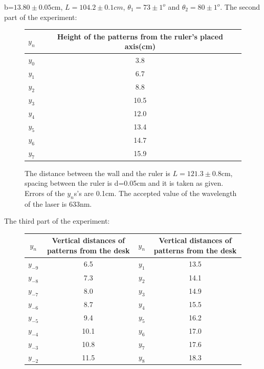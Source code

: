 \documentclass[11pt,a4paper]{article}
\begin{document}
{\begin{figure}[H]
\begin{center}
	\end{center}
\end{figure}
\par b=$13.80\pm0.05$cm, $L=104.2\pm0.1cm$, $\theta_1=73\pm1^o$ and $\theta_2=80\pm1^o$.
The second part of the experiment:
\begin{center}
	\begin{figure} [H] 
		\begin{tabular}{|c |c|} \hline
			$y_n$& Height of the patterns from the ruler's placed axis(cm) \\ [0.5ex] 
			\hline
			$y_0$&3.8 \\
			\hline
			$y_1$ & 6.7\\
			\hline 
			$y_2$ &8.8\\
			\hline 
			$y_3$& 10.5 \\
			\hline 
			$y_4$& 12.0\\
			\hline 
			$y_5$&13.4\\
			\hline 
			$y_6$& 14.7\\
			\hline
			$y_7$&15.9\\
			\hline		
		\end{tabular}
		\caption{The distance between the wall and the ruler is $L=121.3\pm0.8$cm, spacing between the ruler is d=0.05cm and it is taken as given. Errors of the $y_n$s's are 0.1cm. The accepted value of the wavelength of the laser is 633nm.}
	\end{figure}
\end{center}
The third part of the experiment:
\begin{center}
	\begin{figure} [H] 
		\advance\leftskip-1.50cm
		\begin{tabular}{|c |c||c| c|} \hline
			$y_n$& Vertical distances of patterns from the desk&$y_n$& Vertical distances of patterns from the desk \\ [0.5ex] 
			\hline
			$y_{-9}$&6.5& $y_{1}$ &13.5 \\
			\hline
			$y_{-8}$ & 7.3& $y_{2}$ &14.1\\
			\hline 
			$y_{-7}$ &8.0& $y_{3}$& 14.9\\
			\hline 
			$y_{-6}$& 8.7& $y_{4}$ & 15.5 \\
			\hline 
			$y_{-5}$ & 9.4& $y_{5}$ &16.2\\
			\hline 
			$y_{-4}$ &10.1& $y_{6}$ & 17.0\\
			\hline 
			$y_{-3}$ & 10.8& $y_{7}$&17.6\\
			\hline
			$y_{-2}$&11.5&$y_{8}$ & 18.3\\

\end{tabular}
\end{figure}
\end{center}}
\end{document}
